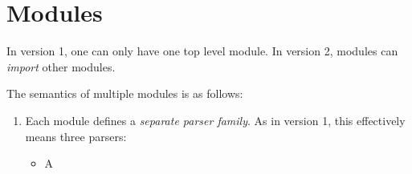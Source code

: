 \documentclass[11pt]{article} %
\begin{document}
\section{Modules}\label{sec:modules}

In version 1, one can only have one top level module. In version 2, modules can \emph{import} other
modules.

The semantics of multiple modules is as follows:
\begin{enumerate}

\item Each module defines a \emph{separate parser family}. As in version 1, this effectively means
  three parsers:
  \begin{itemize}
  \item A
  \end{itemize}


\end{enumerate}
\end{document}
